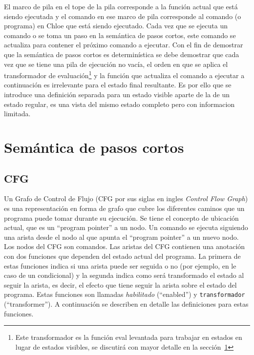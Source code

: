 El marco de pila en el tope de la pila corresponde a la función actual que está siendo ejecutada y el comando en ese marco de pila corresponde al comando (o programa) en Chloe que está siendo ejecutado.
Cada vez que se ejecuta un comando o se toma un paso en la semántica de pasos cortos, este comando se actualiza para contener el próximo comando a ejecutar.
Con el fin de demostrar que la semántica de pasos cortos es determinística se debe demostrar que cada vez que se tiene una pila de ejecución no vacía, el orden en que se aplica el transformador de evaluación\footnote{Este transformador es la función eval levantada para trabajar en estados en lugar de estados visibles, se discutirá con mayor detalle en la sección~\ref{section:small_step}} y la función que actualiza el comando a ejecutar a continuación es irrelevante para el estado final resultante.
Es por ello que se introduce una definición separada para un estado visible aparte de la de un estado regular, es una vista del mismo estado completo pero con informacion limitada.

\section{Semántica de pasos cortos}\label{section:small_step}

\begin{comment}
add a little summary here.
\end{comment}

\subsection{CFG}\label{subsection:cfg}

Un Grafo de Control de Flujo (CFG por sus siglas en ingles \textit{Control Flow Graph}) es una representación en forma de grafo que cubre los diferentes caminos que un programa puede tomar durante su ejecución.
Se tiene el concepto de ubicación actual, que es un ``program pointer'' a un nodo.
Un comando se ejecuta siguiendo una arista desde el nodo al que apunta el ``program pointer'' a un nuevo nodo.
Los nodos del CFG son comandos.
Las aristas del CFG contienen una anotación con dos funciones que dependen del estado actual del programa.
La primera de estas funciones indica si una arista puede ser seguida o no (por ejemplo, en le caso de un condicional) y la segunda indica como será transformado el estado al seguir la arista, es decir, el efecto que tiene seguir la arista sobre el estado del programa.
Estas funciones son llamadas \textit{habilitado} (``enabled'') y \verb|transformador| (``transformer'').
A continuación se describen en detalle las definiciones para estas funciones.


